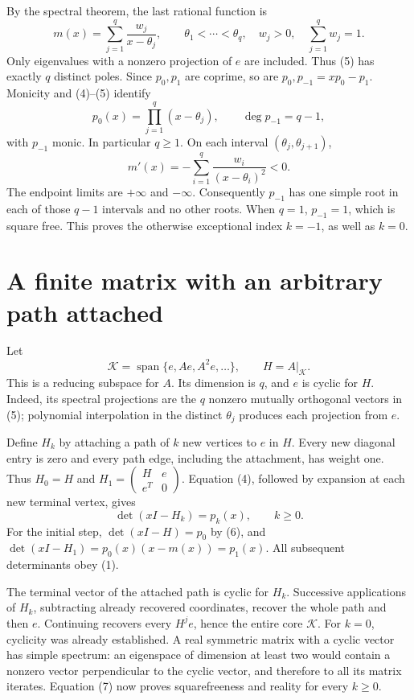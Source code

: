 \documentclass[11pt]{article}
\begin{document}
By the spectral theorem, the last rational function is
\[
 m(x)=\sum_{j=1}^{q}\frac{w_j}{x-\theta_j},\qquad
 \theta_1<\cdots<\theta_q,\quad w_j>0,\quad
 \sum_{j=1}^{q}w_j=1.                                  \tag{5}
\]
Only eigenvalues with a nonzero projection of \(e\) are included.
Thus (5) has exactly \(q\) distinct poles. Since \(p_0,p_1\)
are coprime, so are \(p_0,p_{-1}=xp_0-p_1\).
Monicity and (4)--(5) identify
\[
 p_0(x)=\prod_{j=1}^{q}(x-\theta_j),\qquad
 \deg p_{-1}=q-1,
                                                               \tag{6}
\]
with \(p_{-1}\) monic. In particular \(q\ge1\).
On each interval \((\theta_j,\theta_{j+1})\),
\[
 m'(x)=-\sum_{i=1}^{q}\frac{w_i}{(x-\theta_i)^2}<0.
\]
The endpoint limits are \(+\infty\) and \(-\infty\).
Consequently \(p_{-1}\) has one simple root in each of those
\(q-1\) intervals and no other roots. When \(q=1\),
\(p_{-1}=1\), which is square free. This proves the
otherwise exceptional index \(k=-1\), as well as \(k=0\).

\section*{A finite matrix with an arbitrary path attached}
Let
\[
 \mathcal K=\operatorname{span}\{e,Ae,A^2e,\ldots\},\qquad
 H=A|_{\mathcal K}.
\]
This is a reducing subspace for \(A\). Its dimension is \(q\),
and \(e\) is cyclic for \(H\). Indeed, its spectral projections
are the \(q\) nonzero mutually orthogonal vectors in (5);
polynomial interpolation in the distinct \(\theta_j\) produces
each projection from \(e\).

Define \(H_k\) by attaching a path of \(k\) new vertices to
\(e\) in \(H\). Every new diagonal entry is zero and every
path edge, including the attachment, has weight one.
Thus \(H_0=H\) and \(H_1=\left(\begin{smallmatrix}H&e\\e^T&0
\end{smallmatrix}\right)\).
Equation (4), followed by expansion at each new terminal vertex,
gives
\[
                         \det(xI-H_k)=p_k(x),\qquad k\ge0.
                                                               \tag{7}
\]
For the initial step, \(\det(xI-H)=p_0\) by (6), and
\(\det(xI-H_1)=p_0(x)(x-m(x))=p_1(x)\).
All subsequent determinants obey (1).

The terminal vector of the attached path is cyclic for \(H_k\).
Successive applications of \(H_k\), subtracting already recovered
coordinates, recover the whole path and then \(e\). Continuing
recovers every \(H^je\), hence the entire core \(\mathcal K\).
For \(k=0\), cyclicity was already established.
A real symmetric matrix with a cyclic vector has simple spectrum:
an eigenspace of dimension at least two would contain a nonzero
vector perpendicular to the cyclic vector, and therefore to all
its matrix iterates. Equation (7) now proves squarefreeness
and reality for every \(k\ge0\).
\end{document}
